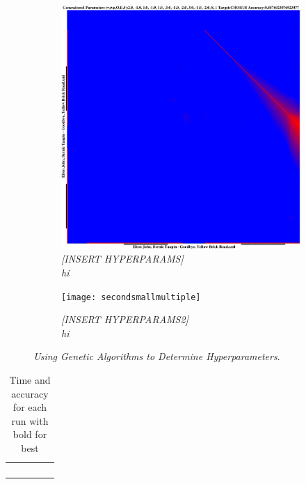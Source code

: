 \documentclass[letterpaper]{article}
\begin{document}
\begin{figure}[th]
\begin{subfigure}{.2\textwidth}
        \includegraphics[width=\linewidth]{firstsmallmultiple}
        \caption{\emph{[INSERT HYPERPARAMS]\\hi}}
    \end{subfigure}
   \begin{subfigure}{.2\textwidth}
        \texttt{[image: secondsmallmultiple]}
        \caption{\emph{[INSERT HYPERPARAMS2]\\hi}}
    \end{subfigure}
    \caption{\emph{Using Genetic Algorithms to Determine Hyperparameters}. }\label{fig:smallmultiple}
\end{figure}

\begin{table}[]
\centering
\caption{Time and accuracy for each run with bold for best}
\label{my-label}
\begin{tabular}{lllll}
 &  &  &  &  \\
 &  &  &  &  \\
 &  &  &  &  \\
 &  &  &  & 
\end{tabular}
\end{table}
\end{document}
